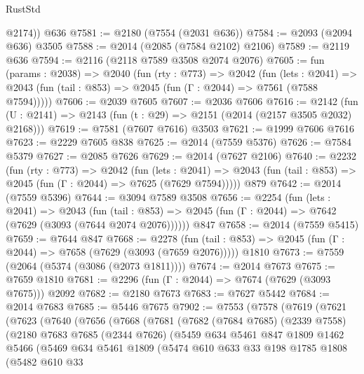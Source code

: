 \begin{lexlean}{RustStd}
\begin{coremodule}
        @2174))
    @636
@7581 := @2180 (@7554 (@2031 @636))
@7584 := @2093 (@2094 @636) @3505
@7588 := @2014 (@2085 (@7584 @2102) @2106)
@7589 := @2119 @636
@7594 := @2116 (@2118 @7589 @3508 @2074 @2076)
@7605 := fun (params : @2038) =>
  @2040
    (fun (rty : @773) =>
    @2042
      (fun (lets : @2041) =>
      @2043 (fun (tail : @853) => @2045 (fun (Γ : @2044) => @7561 (@7588 @7594)))))
@7606 := @2039 @7605
@7607 := @2036 @7606
@7616 := @2142 (fun (U : @2141) => @2143 (fun (t : @29) => @2151 (@2014 (@2157 @3505 @2032) @2168)))
@7619 := @7581 (@7607 @7616) @3503
@7621 := @1999 @7606 @7616
@7623 := @2229 @7605 @838
@7625 := @2014 (@7559 @5376)
@7626 := @7584 @5379
@7627 := @2085 @7626
@7629 := @2014 (@7627 @2106)
@7640 := @2232
    (fun (rty : @773) =>
    @2042
      (fun (lets : @2041) =>
      @2043 (fun (tail : @853) => @2045 (fun (Γ : @2044) => @7625 (@7629 @7594)))))
    @879
@7642 := @2014 (@7559 @5396)
@7644 := @3094 @7589 @3508
@7656 := @2254
    (fun (lets : @2041) =>
    @2043
      (fun (tail : @853) => @2045 (fun (Γ : @2044) => @7642 (@7629 (@3093 (@7644 @2074 @2076))))))
    @847
@7658 := @2014 (@7559 @5415)
@7659 := @7644 @847
@7668 := @2278
    (fun (tail : @853) => @2045 (fun (Γ : @2044) => @7658 (@7629 (@3093 (@7659 @2076)))))
    @1810
@7673 := @7559 (@2064 (@5374 (@3086 (@2073 @1811))))
@7674 := @2014 @7673
@7675 := @7659 @1810
@7681 := @2296 (fun (Γ : @2044) => @7674 (@7629 (@3093 @7675))) @2092
@7682 := @2180 @7673
@7683 := @7627 @5442
@7684 := @2014 @7683
@7685 := @5446 @7675
@7902 := @7553
    (@7578
      (@7619
        (@7621
          (@7623
            (@7640
              (@7656
                (@7668
                  (@7681
                    (@7682
                      (@7684 @7685)
                      (@2339 @7558)
                      (@2180
                        @7683
                        @7685
                        (@2344 @7626)
                        (@5459
                          @634
                          @5461
                          @847
                          @1809
                          @1462
                          @5466
                          (@5469
                            @634
                            @5461
                            @1809
                            (@5474
                              @610
                              @633
                              @33
                              @198
                              @1785
                              @1808
                              (@5482
                                @610
                                @33

\end{coremodule}
\end{lexlean}
